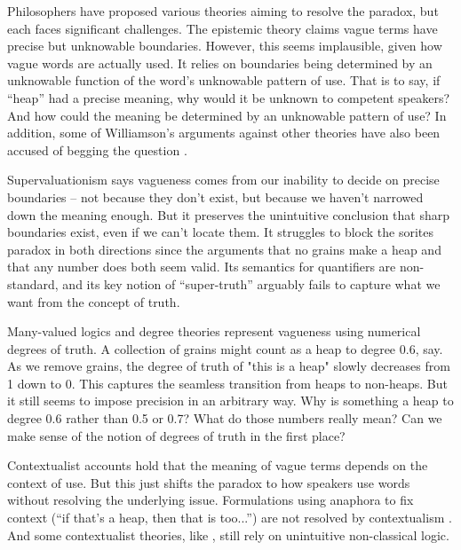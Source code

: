 \documentclass[man,floatsintext]{apa7}
\begin{document}
Philosophers have proposed various theories aiming to resolve the paradox, but each faces significant challenges. The epistemic theory \autocite{sorensenBlindspots1988,williamsonKnowledgeItsLimits2000} claims vague terms have precise but unknowable boundaries. However, this seems implausible, given how vague words are actually used. It relies on boundaries being determined by an unknowable function of the word's unknowable pattern of use. That is to say, if ``heap'' had a precise meaning, why would it be unknown to competent speakers? And how could the meaning be determined by an unknowable pattern of use? In addition, some of Williamson's arguments against other theories have also been accused of begging the question \autocite{wrightEpistemicConceptionVagueness2021}.

Supervaluationism \autocite{fineVaguenessTruthLogic1975,keefeTheoriesVagueness2000} says vagueness comes from our inability to decide on precise boundaries -- not because they don't exist, but because we haven't narrowed down the meaning enough. But it preserves the unintuitive conclusion that sharp boundaries exist, even if we can't locate them. It struggles to block the sorites paradox in both directions since the arguments that no grains make a heap and that any number does both seem valid. Its semantics for quantifiers are non-standard, and its key notion of ``super-truth'' arguably fails to capture what we want from the concept of truth.

Many-valued logics and degree theories \autocite{goguenLogicInexactConcepts1969,zadehFuzzyLogicApproximate1975,smithVaguenessDegreesTruth2008} represent vagueness using numerical degrees of truth. A collection of grains might count as a heap to degree 0.6, say. As we remove grains, the degree of truth of "this is a heap" slowly decreases from 1 down to 0. This captures the seamless transition from heaps to non-heaps. But it still seems to impose precision in an arbitrary way. Why is something a heap to degree 0.6 rather than 0.5 or 0.7? What do those numbers really mean? Can we make sense of the notion of degrees of truth in the first place?

Contextualist accounts \autocite{kampParadoxHeap1981,soamesUnderstandingTruth1999} hold that the meaning of vague terms depends on the context of use. But this just shifts the paradox to how speakers use words without resolving the underlying issue. Formulations using anaphora to fix context (``if that's a heap, then that is too...'') are not resolved by contextualism \autocite{stanleyContextInterestRelativity2003}. And some contextualist theories, like \textcite{shapiroVaguenessContext2006}, still rely on unintuitive non-classical logic.
\end{document}
